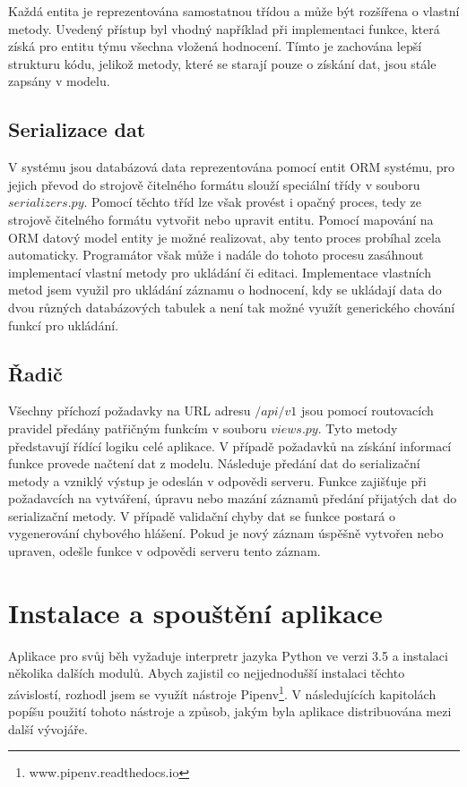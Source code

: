 \documentclass[
  digital, %
  twoside, %
  table,   %
  nolof,     %
  nolot,     %
]{fithesis3}
\begin{document}
Každá entita je reprezentována samostatnou třídou a může být rozšířena o vlastní metody. Uvedený přístup byl vhodný například při implementaci funkce, která získá pro entitu týmu všechna vložená hodnocení. Tímto je zachována lepší strukturu kódu, jelikož metody, které se starají pouze o získání dat, jsou stále zapsány v modelu.

\subsection{Serializace dat}
\label{serializer}
V systému jsou databázová data reprezentována pomocí entit ORM systému, pro jejich převod do strojově čitelného formátu slouží speciální třídy v souboru $serializers.py$. Pomocí těchto tříd lze však provést i opačný proces, tedy ze strojově čitelného formátu vytvořit nebo upravit entitu. Pomocí mapování na ORM datový model entity je možné realizovat, aby tento proces probíhal zcela automaticky. Programátor však může i nadále do tohoto procesu zasáhnout implementací vlastní metody pro ukládání či editaci. Implementace vlastních metod jsem využil pro ukládání záznamu o hodnocení, kdy se ukládají data do dvou různých databázových tabulek a není tak možné využít generického chování funkcí pro ukládání.

\subsection{Řadič}
\label{radic}
Všechny příchozí požadavky na URL adresu $/api/v1$ jsou pomocí routovacích pravidel předány patřičným funkcím v souboru $views.py$. Tyto metody představují řídící logiku celé aplikace. V případě požadavků na získání informací funkce provede načtení dat z modelu. Následuje předání dat do serializační metody a vzniklý výstup je odeslán v odpovědi serveru. Funkce zajišťuje při požadavcích na vytváření, úpravu nebo mazání záznamů předání přijatých dat do serializační metody. V případě validační chyby dat se funkce postará o vygenerování chybového hlášení. Pokud je nový záznam úspěšně vytvořen nebo upraven, odešle funkce v odpovědi serveru tento záznam.

\section{Instalace a spouštění aplikace}
Aplikace pro svůj běh vyžaduje interpretr jazyka Python ve verzi 3.5 a instalaci několika dalších modulů. Abych zajistil co nejjednodušší instalaci těchto závislostí, rozhodl jsem se využít nástroje Pipenv\footnote{www.pipenv.readthedocs.io}. V následujících kapitolách popíšu použití tohoto nástroje a způsob, jakým byla aplikace distribuována mezi další vývojáře.
\end{document}
